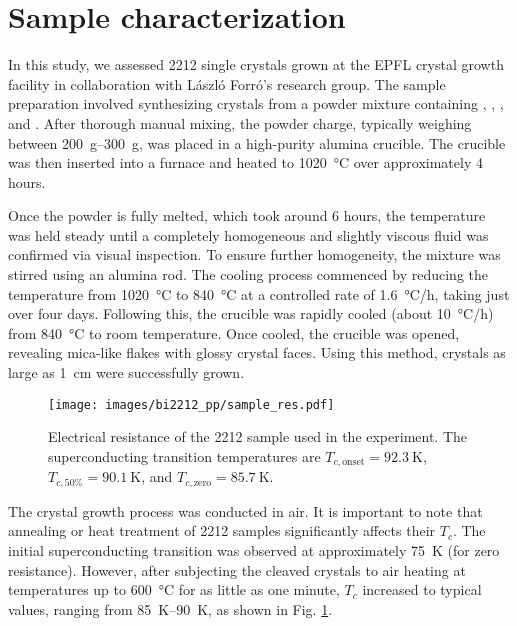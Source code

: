\section{Sample characterization}

In this study, we assessed 2212 single crystals grown at the EPFL crystal growth facility in collaboration with László Forró's research group.
The sample preparation involved synthesizing crystals from a powder mixture containing , , , and .
After thorough manual mixing, the powder charge, typically weighing between \qtyrange{200}{300}{\gram}, was placed in a high-purity alumina crucible. The crucible was then inserted into a furnace and heated to \qty{1020}{\degreeCelsius} over approximately 4 hours.

Once the powder is fully melted, which took around 6 hours, the temperature was held steady until a completely homogeneous and slightly viscous fluid was confirmed via visual inspection.
To ensure further homogeneity, the mixture was stirred using an alumina rod.
The cooling process commenced by reducing the temperature from \qty{1020}{\degreeCelsius} to \qty{840}{\degreeCelsius} at a controlled rate of \qty{1.6}{\degreeCelsius/\hour}, taking just over four days.
Following this, the crucible was rapidly cooled (about \qty{10}{\degreeCelsius/\hour}) from \qty{840}{\degreeCelsius} to room temperature. Once cooled, the crucible was opened, revealing mica-like flakes with glossy crystal faces. Using this method, crystals as large as \qty{1}{\centi\meter} were successfully grown.

\begin{figure}
	\centering
	\texttt{[image: images/bi2212\_pp/sample\_res.pdf]}
	\caption{Electrical resistance of the 2212 sample used in the experiment. The superconducting transition temperatures are $T_{c,\text{onset}} = \qty{92.3}{\kelvin}$, $T_{c,\text{50\%}} = \qty{90.1}{\kelvin}$, and $T_{c,\text{zero}} = \qty{85.7}{\kelvin}$.}
	\label{fig:sample_res}
\end{figure}

The crystal growth process was conducted in air.
It is important to note that annealing or heat treatment of 2212 samples significantly affects their $T_c$.
The initial superconducting transition was observed at approximately \qty{75}{\kelvin} (for zero resistance).
However, after subjecting the cleaved crystals to air heating at temperatures up to \qty{600}{\degreeCelsius} for as little as one minute, $T_c$ increased to typical values, ranging from \qtyrange{85}{90}{\kelvin}, as shown in Fig. \ref{fig:sample_res}.

